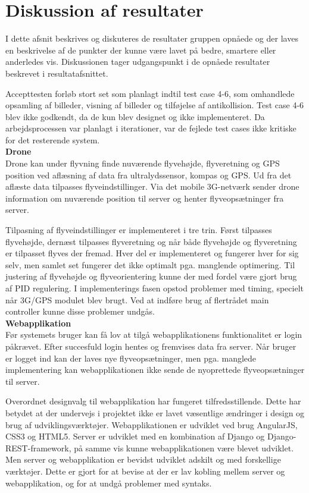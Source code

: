 \section{Diskussion af resultater}

I dette afsnit beskrives og diskuteres de resultater gruppen opnåede og der laves en beskrivelse af de punkter der kunne være lavet på bedre, smartere eller anderledes vis. Diskussionen tager udgangspunkt i de opnåede resultater beskrevet i resultatafsnittet.

Accepttesten forløb stort set som planlagt indtil test case 4-6, som omhandlede opsamling af billeder, visning af billeder og tilføjelse af antikollision. Test case 4-6 blev ikke godkendt, da de kun blev designet og ikke implementeret. Da arbejdsprocessen var planlagt i iterationer, var de fejlede test cases ikke kritiske for det resterende system.\\

\textbf{Drone}\\
Drone kan under flyvning finde nuværende flyvehøjde, flyveretning og GPS position ved aflæsning af data fra ultralydssensor, kompas og GPS.  Ud fra det aflæste data tilpasses flyveindstillinger. Via det mobile 3G-netværk sender drone information om nuværende position til server og henter flyveopsætninger fra server.

Tilpasning af flyveindstillinger er implementeret i tre trin. Først tilpasses flyvehøjde, dernæst tilpasses flyveretning og når både flyvehøjde og flyveretning er tilpasset flyves der fremad. Hver del er implementeret og fungerer hver for sig selv, men samlet set fungerer det ikke optimalt pga. manglende optimering. Til justering af flyvehøjde og flyveorientering kunne der med fordel være gjort brug af PID regulering.  I implementerings fasen opstod problemer med timing, specielt når 3G/GPS modulet blev brugt. Ved at indføre brug af flertrådet main controller kunne disse problemer undgås. \\


\textbf{Webapplikation}\\
Før systemets bruger kan få lov at tilgå webapplikationens funktionalitet er login påkrævet. Efter succesfuld login hentes og fremvises data fra server.
Når bruger er logget ind kan der laves nye flyveopsætninger, men pga. manglede implementering kan webapplikationen ikke sende de nyoprettede flyveopsætninger til server.

Overordnet designvalg til webapplikation har fungeret tilfredsstillende. Dette har betydet at der undervejs i projektet ikke er lavet væsentlige ændringer i design og brug af udviklingsværktøjer. Webapplikationen er udviklet ved brug AngularJS, CSS3 og HTML5. Server er udviklet med en kombination af Django og Django-REST-framework, på samme vis kunne webapplikationen være blevet udviklet. Men server og webapplikation er bevidst udviklet adskilt og med forskellige værktøjer. Dette er gjort for at bevise at der er lav kobling mellem server og webapplikation, og for at undgå problemer med syntaks. 

